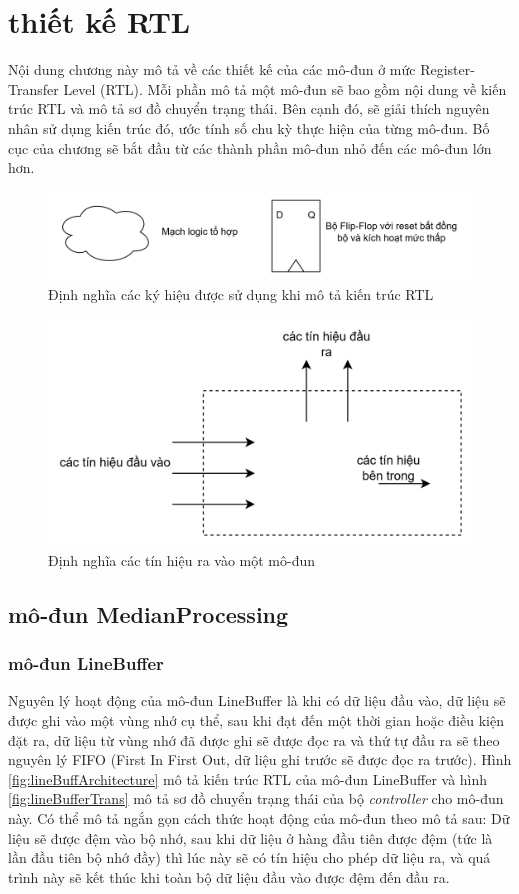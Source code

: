 \clearpage
{}

\setcounter{chapter}{2}
\chapter[{Thiết kế RTL}]{thiết kế RTL}
Nội dung chương này mô tả về các thiết kế của các mô-đun ở mức Register-Transfer Level (RTL). Mỗi phần mô tả một mô-đun sẽ bao gồm nội dung về kiến trúc RTL và mô tả sơ đồ chuyển trạng thái. Bên cạnh đó, sẽ giải thích nguyên nhân sử dụng kiến trúc đó, ước tính số chu kỳ thực hiện của từng mô-đun. Bố cục của chương sẽ bắt đầu từ các thành phần mô-đun nhỏ đến các mô-đun lớn hơn.

\begin{figure}[!ht]
    \centering
    \includegraphics[width=1\linewidth]{figures/commonSymbol.png}
    \caption{Định nghĩa các ký hiệu được sử dụng khi mô tả kiến trúc RTL}
    \label{fig:commonSymbol}
\end{figure}
\begin{figure}[!ht]
	\centering
	\includegraphics[width=0.7\linewidth]{figures/boxSym.png}
	\caption{Định nghĩa các tín hiệu ra vào một mô-đun}
	\label{fig:boxSym}
\end{figure}
\section{mô-đun MedianProcessing}
\subsection{mô-đun LineBuffer}
Nguyên lý hoạt động của mô-đun LineBuffer là khi có dữ liệu đầu vào, dữ liệu sẽ được ghi vào một vùng nhớ cụ thể, sau khi đạt đến một thời gian hoặc điều kiện đặt ra, dữ liệu từ vùng nhớ đã được ghi sẽ được đọc ra và thứ tự đầu ra sẽ theo nguyên lý FIFO (First In First Out, dữ liệu ghi trước sẽ được đọc ra trước). Hình \ref{fig:lineBuffArchitecture} mô tả kiến trúc RTL của mô-đun LineBuffer và hình \ref{fig:lineBufferTrans} mô tả sơ đồ chuyển trạng thái của bộ \textit{controller} cho mô-đun này. Có thể mô tả ngắn gọn cách thức hoạt động của mô-đun theo mô tả sau: Dữ liệu sẽ được đệm vào bộ nhớ, sau khi dữ liệu ở hàng đầu tiên được đệm (tức là lần đầu tiên bộ nhớ đầy) thì lúc này sẽ có tín hiệu cho phép dữ liệu ra, và quá trình này sẽ kết thúc khi toàn bộ dữ liệu đầu vào được đệm đến đầu ra. 


